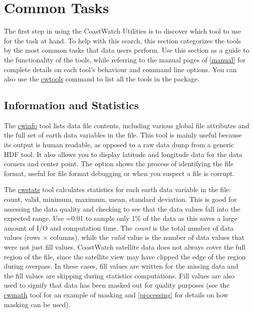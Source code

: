 \chapter{Common Tasks}
\label{common}

The first step in using the CoastWatch Utilities is to discover which
tool to use for the task at hand.  To help with this search, this
section categorizes the tools by the most common tasks that data users
perform.  Use this section as a guide to the functionality
of the tools, while referring to the manual pages of \autoref{manual}
for complete details on each tool's behaviour and command line
options.  You can also use the \hyperlink{cwtools}{cwtools} command to
list all the tools in the package.

\section{Information and Statistics}

The \hyperlink{cwinfo}{cwinfo} tool lists data file contents,
including various global file attributes and the full set of
earth data variables in the file.  This tool is mainly useful
because its output is human readable, as opposed to a raw data
dump from a generic HDF tool.  It also allows you to display
latitude and longitude data for the data corners and center
point.  The  option shows the process of
identifying the file format, useful for file format debugging or
when you suspect a file is corrupt.

The \hyperlink{cwstats}{cwstats} tool calculates statistics for
each earth data variable in the file: count, valid, minimum,
maximum, mean, standard deviation.  This is good for assessing
the data quality and checking to see that the data values fall
into the expected range.  Use =0.01 to sample
only 1\% of the data as this saves a large amount of I/O and
computation time.  The {\em count} is the total number of data
values (rows $\times$ columns), while the {\em valid} value is
the number of data values that were not just fill values.
CoastWatch satellite data does not always cover the full region
of the file, since the satellite view may have clipped the edge
of the region during overpass.  In these cases, fill values are
written for the missing data and the fill values are skipping
during statistics computations.  Fill values are also used to
signify that data has been masked out for quality purposes (see
the \hyperlink{cwmath}{cwmath} tool for an example of masking and
\autoref{processing} for details on how masking can be used).

